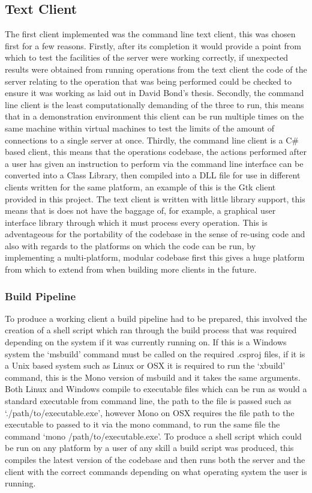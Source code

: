 \documentclass{article}
\begin{document}
\subsection{Text Client}
The first client implemented was the command line text client, this was chosen first for a few reasons. Firstly, after its completion it would provide a point from which to test the facilities of the server were working correctly, if unexpected results were obtained from running operations from the text client the code of the server relating to the operation that was being performed could be checked to ensure it was working as laid out in David Bond’s thesis. Secondly, the command line client is the least computationally demanding of the three to run, this means that in a demonstration environment this client can be run multiple times on the same machine within virtual machines to test the limits of the amount of connections to a single server at once. Thirdly, the command line client is a C\# based client, this means that the operations codebase, the actions performed after a user has given an instruction to perform via the command line interface can be converted into a Class Library, then compiled into a DLL file for use in different clients written for the same platform, an example of this is the Gtk client provided in this project. The text client is written with little library support, this means that is does not have the baggage of, for example, a graphical user interface library through which it must process every operation. This is adventageous for the portability of the codebase in the sense of re-using code and also with regards to the platforms on which the code can be run, by implementing a multi-platform, modular codebase first this gives a huge platform from which to extend from when building more clients in the future. 
\subsubsection{Build Pipeline}
To produce a working client a build pipeline had to be prepared, this involved the creation of a shell script which ran through the build process that was required depending on the system if it was currently running on. If this is a Windows system the ‘msbuild’ command must be called on the required .csproj files, if it is a Unix based system such as Linux or OSX it is required to run the ‘xbuild’ command, this is the Mono version of msbuild and it takes the same arguments. Both Linux and Windows compile to executable files which can be run as would a standard executable from command line, the path to the file is passed such as ‘./path/to/executable.exe’, however Mono on OSX requires the file path to the executable to passed to it via the mono command, to run the same file the command ‘mono /path/to/executable.exe’. To produce a shell script which could be run on any platform by a user of any skill a build script was produced, this compiles the latest version of the codebase and then runs both the server and the client with the correct commands depending on what operating system the user is running.
\end{document}
